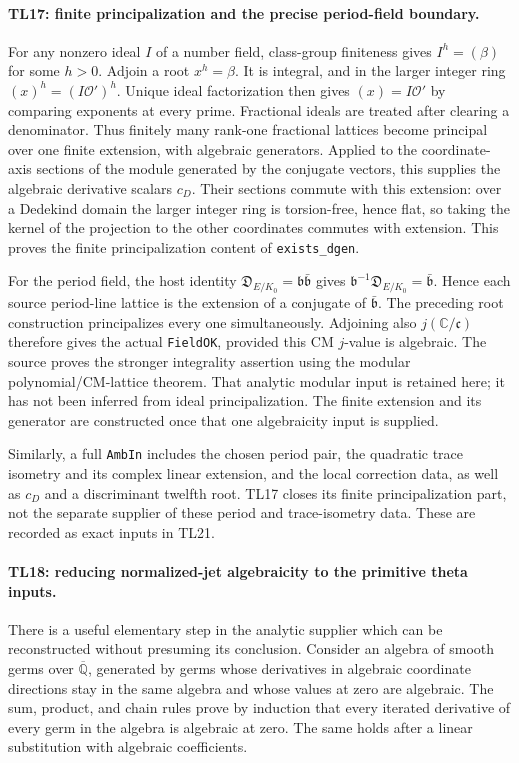 \paragraph{TL17: finite principalization and the precise period-field
boundary.}
For any nonzero ideal $I$ of a number field, class-group finiteness
gives $I^h=(\beta)$ for some $h>0$. Adjoin a root $x^h=\beta$.
It is integral, and in the larger integer ring
$(x)^h=(I\mathcal O')^h$. Unique ideal factorization then gives
$(x)=I\mathcal O'$ by comparing exponents at every prime.
Fractional ideals are treated after clearing a denominator.
Thus finitely many rank-one fractional lattices become principal
over one finite extension, with algebraic generators. Applied to
the coordinate-axis sections of the module generated by the
conjugate vectors, this supplies the algebraic derivative scalars
$c_D$. Their sections commute with this extension: over a
Dedekind domain the larger integer ring is torsion-free, hence
flat, so taking the kernel of the projection to the other
coordinates commutes with extension. This proves the finite
principalization content of \texttt{exists\_dgen}.

For the period field, the host identity
$\mathfrak D_{E/K_0}=\mathfrak b\bar{\mathfrak b}$ gives
$\mathfrak b^{-1}\mathfrak D_{E/K_0}=\bar{\mathfrak b}$.
Hence each source period-line lattice is the extension of a
conjugate of $\bar{\mathfrak b}$. The preceding root construction
principalizes every one simultaneously. Adjoining also
$j(\mathbb C/\mathfrak c)$ therefore gives the actual
\texttt{FieldOK}, provided this CM $j$-value is algebraic.
The source proves the stronger integrality assertion using the
modular polynomial/CM-lattice theorem. That analytic modular
input is retained here; it has not been inferred from ideal
principalization. The finite extension and its generator are
constructed once that one algebraicity input is supplied.

Similarly, a full \texttt{AmbIn} includes the chosen period pair,
the quadratic trace isometry and its complex linear extension,
and the local correction data, as well as $c_D$ and a discriminant
twelfth root. TL17 closes its finite principalization part, not
the separate supplier of these period and trace-isometry data.
These are recorded as exact inputs in TL21.

\paragraph{TL18: reducing normalized-jet algebraicity to the primitive
theta inputs.}
There is a useful elementary step in the analytic supplier which
can be reconstructed without presuming its conclusion. Consider
an algebra of smooth germs over $\overline{\mathbb Q}$, generated
by germs whose derivatives in algebraic coordinate directions
stay in the same algebra and whose values at zero are algebraic.
The sum, product, and chain rules prove by induction that every
iterated derivative of every germ in the algebra is algebraic
at zero. The same holds after a linear substitution with algebraic
coefficients.

